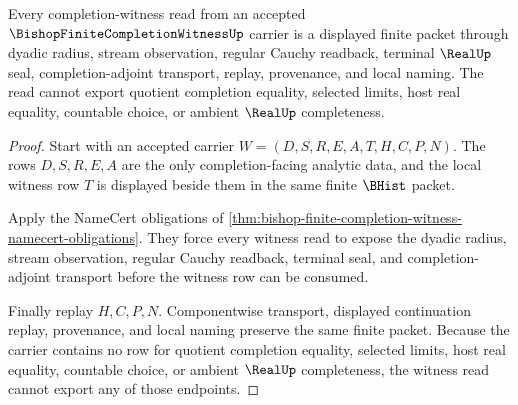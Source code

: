 \begin{theorem}
\label{thm:bishop-finite-completion-witness-finite-choice-nonescape}
Every completion-witness read from an accepted $\BishopFiniteCompletionWitnessUp$ carrier is a displayed finite packet through dyadic radius, stream observation, regular Cauchy readback, terminal $\RealUp$ seal, completion-adjoint transport, replay, provenance, and local naming. The read cannot export quotient completion equality, selected limits, host real equality, countable choice, or ambient $\RealUp$ completeness.
\end{theorem}
\begin{proof}
Start with an accepted carrier $W=(D,S,R,E,A,T,H,C,P,N)$. The rows $D,S,R,E,A$ are the only completion-facing analytic data, and the local witness row $T$ is displayed beside them in the same finite $\BHist$ packet.

Apply the NameCert obligations of \autoref{thm:bishop-finite-completion-witness-namecert-obligations}. They force every witness read to expose the dyadic radius, stream observation, regular Cauchy readback, terminal seal, and completion-adjoint transport before the witness row can be consumed.

Finally replay $H,C,P,N$. Componentwise transport, displayed continuation replay, provenance, and local naming preserve the same finite packet. Because the carrier contains no row for quotient completion equality, selected limits, host real equality, countable choice, or ambient $\RealUp$ completeness, the witness read cannot export any of those endpoints.
\end{proof}


\begin{closurestatus}{\BishopFiniteCompletionWitnessUp}
  \theoryclosure{\seedClosure}
  \formalstatus{\unformalizedV}
\end{closurestatus}
